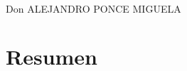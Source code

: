 \documentclass[a4paper,12pt,oneside,titlepage]{book}
\begin{document}
\\
Don ALEJANDRO PONCE MIGUELA
\newpage

\section*{Resumen}


\end{document}
